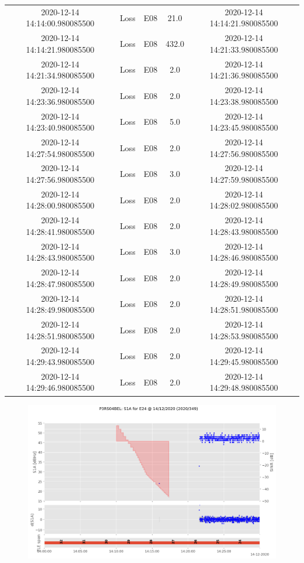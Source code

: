 \begin{enumerate}
\begin{longtabu}{ccccc}
2020{-}12{-}14 14:14:00.980085500&Loss&E08&21.0&2020{-}12{-}14 14:14:21.980085500\\%
2020{-}12{-}14 14:14:21.980085500&Loss&E08&432.0&2020{-}12{-}14 14:21:33.980085500\\%
2020{-}12{-}14 14:21:34.980085500&Loss&E08&2.0&2020{-}12{-}14 14:21:36.980085500\\%
2020{-}12{-}14 14:23:36.980085500&Loss&E08&2.0&2020{-}12{-}14 14:23:38.980085500\\%
2020{-}12{-}14 14:23:40.980085500&Loss&E08&5.0&2020{-}12{-}14 14:23:45.980085500\\%
2020{-}12{-}14 14:27:54.980085500&Loss&E08&2.0&2020{-}12{-}14 14:27:56.980085500\\%
2020{-}12{-}14 14:27:56.980085500&Loss&E08&3.0&2020{-}12{-}14 14:27:59.980085500\\%
2020{-}12{-}14 14:28:00.980085500&Loss&E08&2.0&2020{-}12{-}14 14:28:02.980085500\\%
2020{-}12{-}14 14:28:41.980085500&Loss&E08&2.0&2020{-}12{-}14 14:28:43.980085500\\%
2020{-}12{-}14 14:28:43.980085500&Loss&E08&3.0&2020{-}12{-}14 14:28:46.980085500\\%
2020{-}12{-}14 14:28:47.980085500&Loss&E08&2.0&2020{-}12{-}14 14:28:49.980085500\\%
2020{-}12{-}14 14:28:49.980085500&Loss&E08&2.0&2020{-}12{-}14 14:28:51.980085500\\%
2020{-}12{-}14 14:28:51.980085500&Loss&E08&2.0&2020{-}12{-}14 14:28:53.980085500\\%
2020{-}12{-}14 14:29:43.980085500&Loss&E08&2.0&2020{-}12{-}14 14:29:45.980085500\\%
2020{-}12{-}14 14:29:46.980085500&Loss&E08&2.0&2020{-}12{-}14 14:29:48.980085500\\%
\hline%
\end{longtabu}%


\begin{figure}[H]%
\centering%
\includegraphics[width=0.95\linewidth]{png/P3RS04BEL_R_20203490000_01D_00U_MO_E-S1A-E24.png}%
\end{figure}


\end{enumerate}
